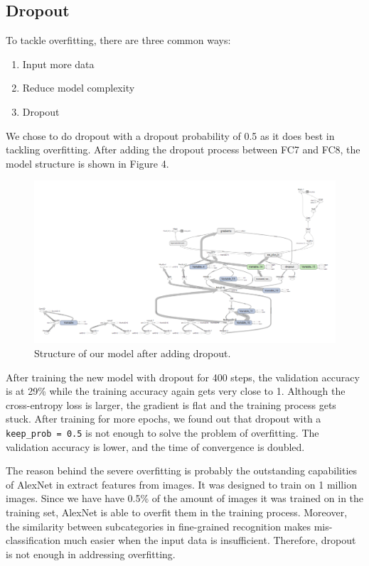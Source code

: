 \documentclass[letterpaper, 12pt]{article}
\begin{document}
\subsection{Dropout}
To tackle overfitting, there are three common ways:
\begin{center}
    \begin{enumerate}
        \item Input more data
        \item Reduce model complexity
        \item Dropout
    \end{enumerate}
\end{center}

We chose to do dropout with a dropout probability of 0.5 as it does best in tackling overfitting.
After adding the dropout process between FC7 and FC8, the model structure is shown in Figure 4.
\begin{figure}
    \begin{center}
        \includegraphics[width=\textwidth]{structure}
        \caption{Structure of our model after adding dropout.}
    \end{center}
\end{figure}
After training the new model with dropout for 400 steps, the validation accuracy is at 29\% while the training accuracy again
gets very close to 1. Although the cross-entropy loss is larger, the gradient is flat and the training process gets stuck.
After training for more epochs, we found out that dropout with a \texttt{keep\_prob = 0.5} is not enough to solve the problem of
overfitting. The validation accuracy is lower, and the time of convergence is doubled.

The reason behind the severe overfitting is probably the outstanding capabilities of AlexNet in extract features from images. It was
designed to train on 1 million images. Since we have have 0.5\% of the amount of images it was trained on in the training set, AlexNet
is able to overfit them in the training process. Moreover, the similarity between subcategories in fine-grained recognition makes
mis-classification much easier when the input data is insufficient. Therefore, dropout is not enough in addressing overfitting.
\end{document}
